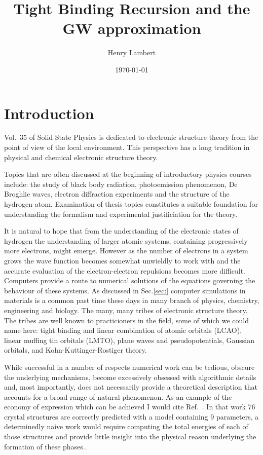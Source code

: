 \documentclass{article}
\begin{document}
\title{Tight Binding Recursion and the GW approximation}
\author{Henry Lambert}
\date{\today}
\maketitle

\section{Introduction}
  Vol.~35 of Solid State Physics is dedicated to electronic structure
theory from the point of view of the local environment. This perspective
has a long tradition in physical and chemical electronic structure theory.

  Topics that are often discussed at the beginning of introductory physics courses include:
the study of black body radiation, photoemission phenomenon, De Broghlie waves,
electron diffraction experiments and the structure of the hydrogen atom.
Examination of thesis topics constitutes a suitable foundation 
for understanding the formalism and experimental justificiation for the theory.

  It is natural to hope that from the understanding of the electronic states of hydrogen the
understanding of larger atomic systems, containing progressively more electrons, might emerge. 
However as the number of electrons in a system grows the wave function becomes 
somewhat unwieldly to work with and the accurate evaluation of the 
electron-electron repulsions becomes more difficult. Computers provide a route
to numerical solutions of the equations governing the behaviour of these systems.
As discussed in Sec.\ref{sec:} computer simulations in materials is a common past time
these days in many branch of physics, chemistry, engineering and biology.
The many, many tribes of electronic structure theory. The tribes are well known 
to practicioners in the field, some of which we could name 
here: tight binding and linear combination of atomic orbitals (LCAO), 
linear muffing tin orbitals (LMTO), plane waves and pseudopotentials, 
Gaussian orbitals, and Kohn-Kuttinger-Rostiger theory.

 While successful in a number of respects numerical work can be tedious, obscure the underlying
mechanisms, become excessively obsessed with algorithmic details and, most importantly,
does not necessarily provide a theoretical description that accounts for a broad range
of natural phenomenon. As an example of the economy of expression which can be achieved 
I would cite Ref.~\cite{johannes76}. In that work 76 crystal structures are correctly predicted 
with a model containing 9 parameters, a determinedly naive work would
require computing the total energies of each of those structures and provide little insight into the physical
reason underlying the formation of these phases..
\end{document}
